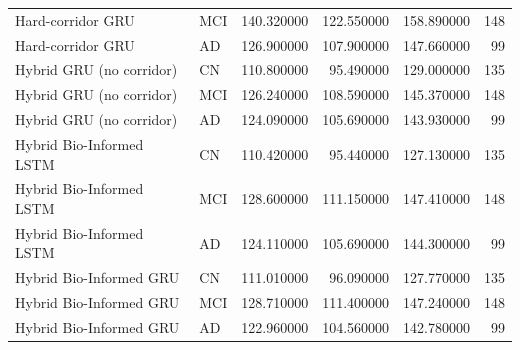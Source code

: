 \begin{tabular}{llrrrr}
Hard-corridor GRU & MCI & 140.320000 & 122.550000 & 158.890000 & 148 \\
Hard-corridor GRU & AD & 126.900000 & 107.900000 & 147.660000 & 99 \\
Hybrid GRU (no corridor) & CN & 110.800000 & 95.490000 & 129.000000 & 135 \\
Hybrid GRU (no corridor) & MCI & 126.240000 & 108.590000 & 145.370000 & 148 \\
Hybrid GRU (no corridor) & AD & 124.090000 & 105.690000 & 143.930000 & 99 \\
Hybrid Bio-Informed LSTM & CN & 110.420000 & 95.440000 & 127.130000 & 135 \\
Hybrid Bio-Informed LSTM & MCI & 128.600000 & 111.150000 & 147.410000 & 148 \\
Hybrid Bio-Informed LSTM & AD & 124.110000 & 105.690000 & 144.300000 & 99 \\
Hybrid Bio-Informed GRU & CN & 111.010000 & 96.090000 & 127.770000 & 135 \\
Hybrid Bio-Informed GRU & MCI & 128.710000 & 111.400000 & 147.240000 & 148 \\
Hybrid Bio-Informed GRU & AD & 122.960000 & 104.560000 & 142.780000 & 99 \\
\bottomrule
\end{tabular}
